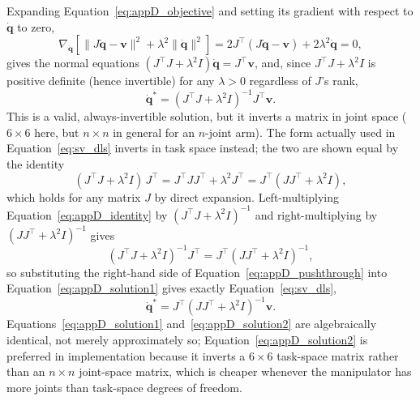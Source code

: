 Expanding Equation~\eqref{eq:appD_objective} and setting its gradient with respect to
$\dot{\mathbf{q}}$ to zero,
\begin{equation}
\nabla_{\dot{\mathbf{q}}}\left[ \lVert J\dot{\mathbf{q}}-\mathbf{v} \rVert^2 + \lambda^2\lVert
\dot{\mathbf{q}} \rVert^2 \right]
= 2J^\top(J\dot{\mathbf{q}}-\mathbf{v}) + 2\lambda^2\dot{\mathbf{q}} = 0,
\label{eq:appD_gradzero}
\end{equation}
gives the normal equations $(J^\top J + \lambda^2 I)\dot{\mathbf{q}} = J^\top\mathbf{v}$, and, since
$J^\top J + \lambda^2 I$ is positive definite (hence invertible) for any $\lambda > 0$ regardless of
$J$'s rank,
\begin{equation}
\dot{\mathbf{q}}^* = \left( J^\top J + \lambda^2 I \right)^{-1} J^\top \mathbf{v}.
\label{eq:appD_solution1}
\end{equation}
This is a valid, always-invertible solution, but it inverts a matrix in joint space
($6\times6$ here, but $n\times n$ in general for an $n$-joint arm). The form actually used in
Equation~\eqref{eq:sv_dls} inverts in task space instead; the two are shown equal by the identity
\begin{equation}
(J^\top J + \lambda^2 I)\,J^\top = J^\top J J^\top + \lambda^2 J^\top = J^\top (JJ^\top+\lambda^2I),
\label{eq:appD_identity}
\end{equation}
which holds for any matrix $J$ by direct expansion. Left-multiplying Equation~\eqref{eq:appD_identity}
by $(J^\top J+\lambda^2I)^{-1}$ and right-multiplying by $(JJ^\top+\lambda^2I)^{-1}$ gives
\begin{equation}
(J^\top J+\lambda^2I)^{-1}J^\top = J^\top(JJ^\top+\lambda^2I)^{-1},
\label{eq:appD_pushthrough}
\end{equation}
so substituting the right-hand side of Equation~\eqref{eq:appD_pushthrough} into
Equation~\eqref{eq:appD_solution1} gives exactly Equation~\eqref{eq:sv_dls},
\begin{equation}
\dot{\mathbf{q}}^* = J^\top\left( JJ^\top+\lambda^2I \right)^{-1}\mathbf{v}.
\label{eq:appD_solution2}
\end{equation}
Equations~\eqref{eq:appD_solution1} and~\eqref{eq:appD_solution2} are algebraically identical, not
merely approximately so; Equation~\eqref{eq:appD_solution2} is preferred in implementation because it
inverts a $6\times6$ task-space matrix rather than an $n\times n$ joint-space matrix, which is
cheaper whenever the manipulator has more joints than task-space degrees of freedom.

